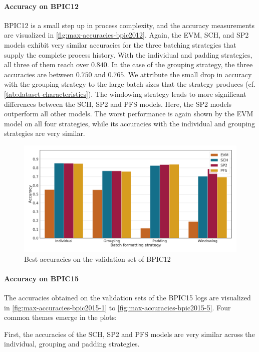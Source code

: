 \paragraph{Accuracy on BPIC12}
BPIC12 is a small step up in process complexity, and the accuracy measurements are visualized in \autoref{fig:max-accuracies-bpic2012}.
Again, the EVM, SCH, and SP2 models exhibit very similar accuracies for the three batching strategies that supply the complete process history.
With the individual and padding strategies, all three of them reach over $0.840$.
In the case of the grouping strategy, the three accuracies are between $0.750$ and $0.765$.
We attribute the small drop in accuracy with the grouping strategy to the large batch sizes that the strategy produces (cf. \autoref{tab:dataset-characteristics}).
The windowing strategy leads to more significant differences between the SCH, SP2 and PFS models.
Here, the SP2 models outperform all other models.
The worst performance is again shown by the EVM model on all four strategies, while its accuracies with the individual and grouping strategies are very similar.

\begin{figure}[!htb]
    \centering
    \includegraphics[width=\textwidth]{gfx/bpic2012/accuracies.pdf}
    \caption{Best accuracies on the validation set of BPIC12}
    \label{fig:max-accuracies-bpic2012}
\end{figure}

\paragraph{Accuracy on BPIC15}
The accuracies obtained on the validation sets of the BPIC15 logs are visualized in \autoref{fig:max-accuracies-bpic2015-1} to \autoref{fig:max-accuracies-bpic2015-5}.
Four common themes emerge in the plots:

First, the accuracies of the SCH, SP2 and PFS models are very similar across the individual, grouping and padding strategies.

